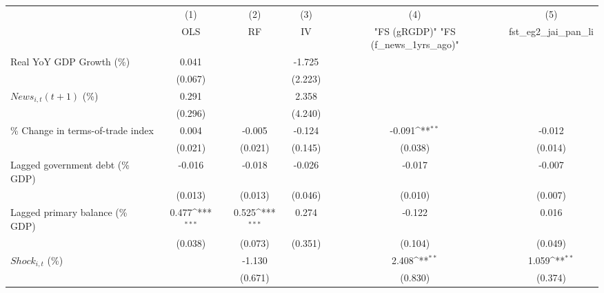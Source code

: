 {
\def\sym#1{\ifmmode^{#1}\else\(^{#1}\)\fi}
\begin{tabular}{l*{5}{c}}
\toprule
                    &\multicolumn{1}{c}{(1)}&\multicolumn{1}{c}{(2)}&\multicolumn{1}{c}{(3)}&\multicolumn{1}{c}{(4)}&\multicolumn{1}{c}{(5)}\\
                    &\multicolumn{1}{c}{OLS}&\multicolumn{1}{c}{RF}&\multicolumn{1}{c}{IV}&\multicolumn{1}{c}{ "FS (gRGDP)"  "FS (f_news_1yrs_ago)" }&\multicolumn{1}{c}{fst_eg2_jai_pan_li}\\
\midrule
Real YoY GDP Growth (\%)&       0.041         &                     &      -1.725         &                     &                     \\
                    &     (0.067)         &                     &     (2.223)         &                     &                     \\
\addlinespace
$ News_{i,t}(t+1)$ (\%)&       0.291         &                     &       2.358         &                     &                     \\
                    &     (0.296)         &                     &     (4.240)         &                     &                     \\
\addlinespace
\% Change in terms-of-trade index&       0.004         &      -0.005         &      -0.124         &      -0.091\sym{**} &      -0.012         \\
                    &     (0.021)         &     (0.021)         &     (0.145)         &     (0.038)         &     (0.014)         \\
\addlinespace
Lagged government debt (\% GDP)&      -0.016         &      -0.018         &      -0.026         &      -0.017         &      -0.007         \\
                    &     (0.013)         &     (0.013)         &     (0.046)         &     (0.010)         &     (0.007)         \\
\addlinespace
Lagged primary balance (\% GDP)&       0.477\sym{***}&       0.525\sym{***}&       0.274         &      -0.122         &       0.016         \\
                    &     (0.038)         &     (0.073)         &     (0.351)         &     (0.104)         &     (0.049)         \\
\addlinespace
$ Shock_{i,t}$ (\%) &                     &      -1.130         &                     &       2.408\sym{**} &       1.059\sym{**} \\
                    &                     &     (0.671)         &                     &     (0.830)         &     (0.374)         \\

\end{tabular}}
